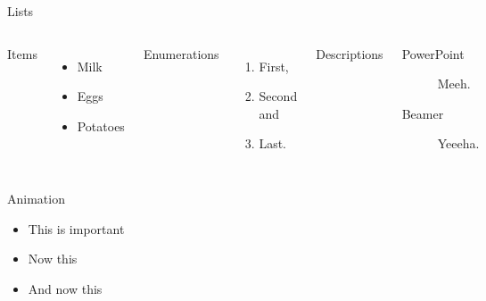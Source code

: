 \documentclass[10pt]{beamer}
\begin{document}
\begin{frame}{Lists}
  \begin{columns}[T,onlytextwidth]
      Items
      \begin{itemize}
        \item Milk \item Eggs \item Potatoes
      \end{itemize}

      Enumerations
      \begin{enumerate}
        \item First, \item Second and \item Last.
      \end{enumerate}

      Descriptions
      \begin{description}
        \item[PowerPoint] Meeh. \item[Beamer] Yeeeha.
      \end{description}
  \end{columns}
\end{frame}
\begin{frame}{Animation}
  \begin{itemize}[<+- | alert@+>]
    \item \alert<4>{This is important}
    \item Now this
    \item And now this
  \end{itemize}
\end{frame}
\end{document}
